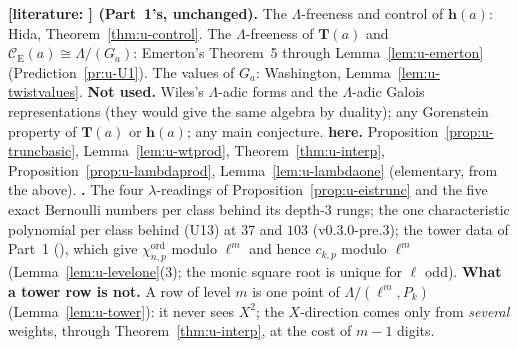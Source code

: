 \documentclass[11pt]{article}
\newcommand{\LIT}[1]{\textsf{[literature: #1]}}   %
\newcommand{\Iw}{\Lambda}                         %
\newcommand{\hcusp}{\mathbf{h}}                   %
\newcommand{\Tu}{\mathbf{T}}                      %
\newcommand{\Pk}[1]{P_{#1}}                       %
\newcommand{\Eis}{\mathrm{E}}
\newcommand{\Cg}{\mathcal{C}}                     %
\begin{document}
\begin{remark}\label{rmk:u-lambdabasis}
\textbf{\LIT{} (Part~1's, unchanged).} The $\Iw$-freeness and control of $\hcusp(a)$: Hida, Theorem~\ref{thm:u-control}. The $\Iw$-freeness of $\Tu(a)$ and
$\Cg_\Eis(a)\cong\Iw/(G_a)$: Emerton's Theorem~5 through Lemma~\ref{lem:u-emerton} (Prediction~\ref{pr:u-U1}). The values of $G_a$: Washington, Lemma~\ref{lem:u-twistvalues}.
\textbf{Not used.} Wiles's $\Iw$-adic forms and the $\Iw$-adic Galois representations \cite{wiles_ordinary} (they would give the same algebra by duality); any
Gorenstein property of $\Tu(a)$ or $\hcusp(a)$; any main conjecture. \textbf{\PROVED{} here.} Proposition~\ref{prop:u-truncbasic}, Lemma~\ref{lem:u-wtprod},
Theorem~\ref{thm:u-interp}, Proposition~\ref{prop:u-lambdaprod}, Lemma~\ref{lem:u-lambdaone} (elementary, from the above). \textbf{\COMP.} The four $\lambda$-readings
of Proposition~\ref{prop:u-eistrunc} and the five exact Bernoulli numbers per class behind its depth-$3$ rungs; the one characteristic polynomial per class behind
(U13) at $37$ and $103$ (v0.3.0-pre.3); the tower data of Part~1 (), which give $\chi^{\mathrm{ord}}_{n,p}$ modulo
$\ell^{m}$ and hence $c_{k,p}$ modulo $\ell^{m}$ (Lemma~\ref{lem:u-levelone}(3); the monic square root is unique for $\ell$ odd). \textbf{What a tower row is not.} A
row of level $m$ is one point of $\Iw/(\ell^{m},\Pk{k})$ (Lemma~\ref{lem:u-tower}): it never sees $X^{2}$; the $X$-direction comes only from \emph{several}
weights, through Theorem~\ref{thm:u-interp}, at the cost of $m-1$ digits.
\end{remark}
\end{document}
